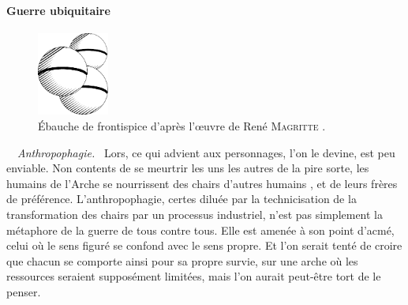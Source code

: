 \paragraph{Guerre ubiquitaire}%
\begin{figure}
	\vspace{-1em}
	\centering
	\includegraphics[width=0.21\textwidth]{frontispice-voix-des-airs.pdf}
	\caption{Ébauche de frontispice d’après l’œuvre de René \textsc{Magritte} .}
	\vspace{-2.0em}
\end{figure}
\
\
{\em\normalsize Anthropophagie.}~
Lors, ce qui advient aux personnages, l’on le devine, est peu enviable. Non contents de se meurtrir les uns les autres de la pire sorte, les humains de l’Arche se nourrissent des chairs d’autres humains , et de leurs frères de préférence.
L’anthropophagie, certes diluée par la technicisation de la transformation des chairs par un processus industriel, n’est pas simplement la métaphore de la guerre de tous contre tous. Elle est amenée à son point d’acmé, celui où le sens figuré se confond avec le sens propre. 
Et l’on serait tenté de croire que chacun se comporte ainsi pour sa propre survie, sur une arche où les ressources seraient supposément limitées, mais l’on aurait peut-être tort de le penser.

